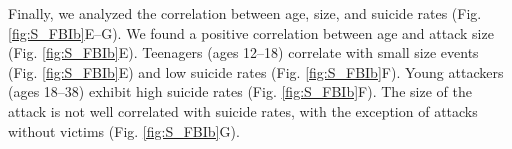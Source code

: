 Finally, we analyzed the correlation between age, size, and suicide rates (Fig. \ref{fig:S_FBIb}E--G). We found a positive correlation between age and attack size (Fig. \ref{fig:S_FBIb}E). 
Teenagers (ages 12--18) correlate with small size events (Fig. \ref{fig:S_FBIb}E) and low suicide rates (Fig. \ref{fig:S_FBIb}F). Young attackers (ages 18--38) exhibit high suicide rates (Fig. \ref{fig:S_FBIb}F). The size of the attack is not well correlated with suicide rates, with the exception of attacks without victims (Fig. \ref{fig:S_FBIb}G). 
